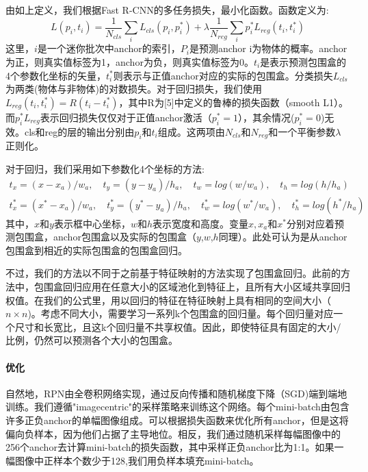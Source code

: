 \documentclass[12pt,a4paper,titlepage]{article}
\begin{document}
由如上定义，我们根据Fast R-CNN的多任务损失，最小化函数。函数定义为:
\begin{equation}
L({p_i},{t_i})=\frac{1}{N_{cls}}\sum_iL_{cls}(p_i,p_i^*)+\lambda\frac{1}{N_{reg}}\sum_ip_i^*L_{reg}(t_i,t_i^*  )
\end{equation}
这里，$i$是一个迷你批次中anchor的索引，$P_i$是预测anchor i为物体的概率。anchor为正，则真实值标签为1，anchor为负，则真实值标签为0。$t_i$是表示预测包围盒的4个参数化坐标的矢量，$t_i^*$则表示与正值anchor对应的实际的包围盒。分类损失$L_{cls}$为两类(物体与非物体)的对数损失。对于回归损失，我们使用$L_{reg}(t_i,t_i^*)=R(t_i-t_i^*)$，其中R为[5]中定义的鲁棒的损失函数（smooth L1）。而$p_i^*L_{reg}$表示回归损失仅仅对于正值anchor激活（$p_i^*=1$），其余情况($p_i^*=0$)无效。cls和reg的层的输出分别由{$p_i$}和{$t_i$}组成。这两项由$N_{cls}$和$N_{reg}$和一个平衡参数$\lambda$正则化。\par

对于回归，我们采用如下参数化4个坐标的方法:
\[
\begin{split}
t_x = (x-x_a)/w_a,\quad t_y = (y-y_a)/h_a,\quad t_w = log(w/w_a),\quad t_h = log(h/h_a)\\
t_x^* = (x^*-x_a)/w_a,\quad t_y^* = (y^*-y_a)/h_a,\quad t_w^* = log(w^*/w_a),\quad t_h^* = log(h^*/h_a)
\end{split}
\]
其中，$x$和$y$表示框中心坐标，$w$和$h$表示宽度和高度。变量$x,x_a$和$x^*$分别对应着预测包围盒，anchor包围盒以及实际的包围盒（$y$,$w$,$h$同理）。此处可认为是从anchor包围盒到相近的实际包围盒的包围盒回归。\par

不过，我们的方法以不同于之前基于特征映射的方法实现了包围盒回归。此前的方法中，包围盒回归应用在任意大小的区域池化到特征上，且所有大小区域共享回归权值。在我们的公式里，用以回归的特征在特征映射上具有相同的空间大小（$n \times n$)。考虑不同大小，需要学习一系列k个包围盒的回归量。每个回归量对应一个尺寸和长宽比，且这k个回归量不共享权值。因此，即使特征具有固定的大小/比例，仍然可以预测各个大小的包围盒。

\paragraph{优化}
自然地，RPN由全卷积网络实现，通过反向传播和随机梯度下降（SGD)端到端地训练。我们遵循"imagecentric"的采样策略来训练这个网络。每个mini-batch由包含许多正负anchor的单幅图像组成。可以根据损失函数来优化所有anchor，但是这将偏向负样本，因为他们占据了主导地位。相反，我们通过随机采样每幅图像中的256个anchor去计算mini-batch的损失函数，其中采样正负anchor比为1:1。如果一幅图像中正样本个数少于128,我们用负样本填充mini-batch。\par
\end{document}
